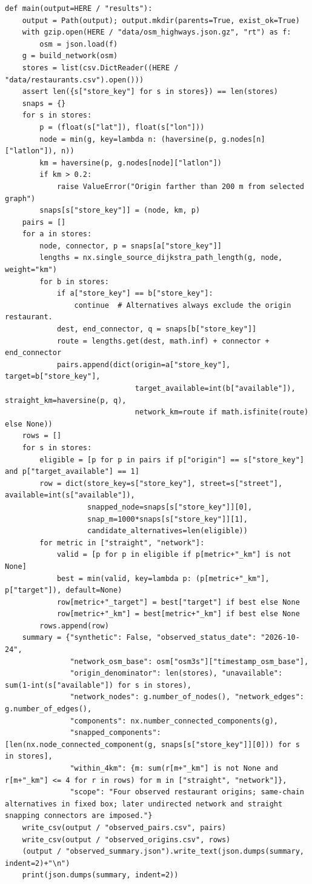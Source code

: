 \begin{Verbatim}[breaklines,breakanywhere,fontsize=\small]
def main(output=HERE / "results"):
    output = Path(output); output.mkdir(parents=True, exist_ok=True)
    with gzip.open(HERE / "data/osm_highways.json.gz", "rt") as f:
        osm = json.load(f)
    g = build_network(osm)
    stores = list(csv.DictReader((HERE / "data/restaurants.csv").open()))
    assert len({s["store_key"] for s in stores}) == len(stores)
    snaps = {}
    for s in stores:
        p = (float(s["lat"]), float(s["lon"]))
        node = min(g, key=lambda n: (haversine(p, g.nodes[n]["latlon"]), n))
        km = haversine(p, g.nodes[node]["latlon"])
        if km > 0.2:
            raise ValueError("Origin farther than 200 m from selected graph")
        snaps[s["store_key"]] = (node, km, p)
    pairs = []
    for a in stores:
        node, connector, p = snaps[a["store_key"]]
        lengths = nx.single_source_dijkstra_path_length(g, node, weight="km")
        for b in stores:
            if a["store_key"] == b["store_key"]:
                continue  # Alternatives always exclude the origin restaurant.
            dest, end_connector, q = snaps[b["store_key"]]
            route = lengths.get(dest, math.inf) + connector + end_connector
            pairs.append(dict(origin=a["store_key"], target=b["store_key"],
                              target_available=int(b["available"]), straight_km=haversine(p, q),
                              network_km=route if math.isfinite(route) else None))
    rows = []
    for s in stores:
        eligible = [p for p in pairs if p["origin"] == s["store_key"] and p["target_available"] == 1]
        row = dict(store_key=s["store_key"], street=s["street"], available=int(s["available"]),
                   snapped_node=snaps[s["store_key"]][0],
                   snap_m=1000*snaps[s["store_key"]][1],
                   candidate_alternatives=len(eligible))
        for metric in ["straight", "network"]:
            valid = [p for p in eligible if p[metric+"_km"] is not None]
            best = min(valid, key=lambda p: (p[metric+"_km"], p["target"]), default=None)
            row[metric+"_target"] = best["target"] if best else None
            row[metric+"_km"] = best[metric+"_km"] if best else None
        rows.append(row)
    summary = {"synthetic": False, "observed_status_date": "2026-10-24",
               "network_osm_base": osm["osm3s"]["timestamp_osm_base"],
               "origin_denominator": len(stores), "unavailable": sum(1-int(s["available"]) for s in stores),
               "network_nodes": g.number_of_nodes(), "network_edges": g.number_of_edges(),
               "components": nx.number_connected_components(g),
               "snapped_components": [len(nx.node_connected_component(g, snaps[s["store_key"]][0])) for s in stores],
               "within_4km": {m: sum(r[m+"_km"] is not None and r[m+"_km"] <= 4 for r in rows) for m in ["straight", "network"]},
               "scope": "Four observed restaurant origins; same-chain alternatives in fixed box; later undirected network and straight snapping connectors are imposed."}
    write_csv(output / "observed_pairs.csv", pairs)
    write_csv(output / "observed_origins.csv", rows)
    (output / "observed_summary.json").write_text(json.dumps(summary, indent=2)+"\n")
    print(json.dumps(summary, indent=2))



\end{Verbatim}
